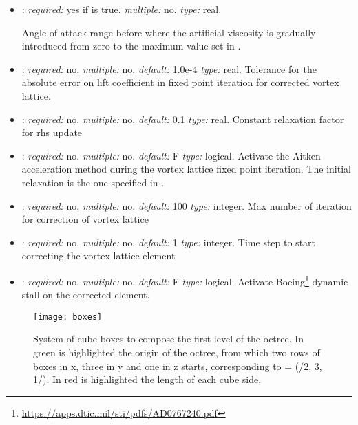 \begin{itemize}
\item {}: \textit{required:} yes if  is true. \textit{multiple:} no. \textit{type:} real.

Angle of attack range before  where the artificial viscosity is gradually introduced from zero to the maximum value set in .

\item {}: \textit{required:} no. \textit{multiple:} no. \textit{default:} 1.0e-4 \textit{type:} real. 
Tolerance for the absolute error on lift coefficient in fixed point iteration for corrected vortex lattice.

\item {}: \textit{required:} no. \textit{multiple:} no. \textit{default:} 0.1 \textit{type:} real. 
Constant relaxation factor for rhs update

\item {}: \textit{required:} no. \textit{multiple:} no. \textit{default:} F \textit{type:} logical. 
Activate the Aitken acceleration method during the vortex lattice fixed point iteration. The initial relaxation is the one specified in . 

\item {}: \textit{required:} no. \textit{multiple:} no. \textit{default:} 100 \textit{type:} integer. 
Max number of iteration for correction of vortex lattice

\item {}: \textit{required:} no. \textit{multiple:} no. \textit{default:} 1 \textit{type:} integer. 
Time step to start correcting the vortex lattice element

\item {}: \textit{required:} no. \textit{multiple:} no. \textit{default:} F \textit{type:} logical. 
Activate Boeing\footnote{\url{https://apps.dtic.mil/sti/pdfs/AD0767240.pdf}} dynamic stall on the corrected  element.   



\end{itemize}

\begin{figure}
\centering
\texttt{[image: boxes]}
\caption{System of cube boxes to compose the first level of the octree. In green is highlighted the origin of the octree, from which two rows of boxes in x, three in y and one in z starts, corresponding to  = (/2, 3, 1/). In red is highlighted the length of each cube side, }
\label{fig:boxes1}
\end{figure}




